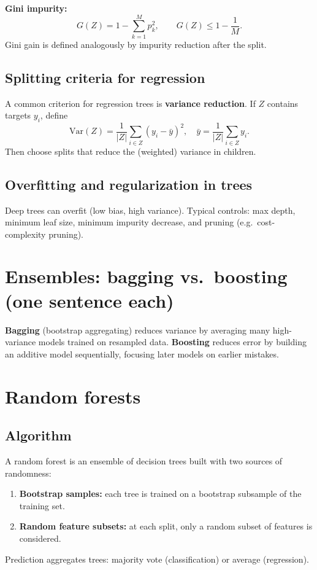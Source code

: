 \documentclass[11pt, oneside]{book}
\newcommand{\Var}{\mathrm{Var}}
\newcommand{\1}{\ind}                       %
\begin{document}
\textbf{Gini impurity:}
\[
  G(Z)=1-\sum_{k=1}^{M}p_k^2,
\qquad
G(Z)\le 1-\frac{1}{M}.
\]
Gini gain is defined analogously by impurity reduction after the split.

\subsection{Splitting criteria for regression}
A common criterion for regression trees is \textbf{variance reduction}.
If $Z$ contains targets $y_i$, define
\[
  \Var(Z)=\frac{1}{|Z|}\sum_{i\in Z}(y_i-\bar y)^2,
\quad \bar y=\frac{1}{|Z|}\sum_{i\in Z} y_i.
\]
Then choose splits that reduce the (weighted) variance in children.

\subsection{Overfitting and regularization in trees}
Deep trees can overfit (low bias, high variance). Typical controls:
max depth, minimum leaf size, minimum impurity decrease, and pruning (e.g.\ cost-complexity pruning).

\section{Ensembles: bagging vs.\ boosting (one sentence each)}
\textbf{Bagging} (bootstrap aggregating) reduces variance by averaging many high-variance models trained on resampled data.
\textbf{Boosting} reduces error by building an additive model sequentially, focusing later models on earlier mistakes.

\section{Random forests}
\subsection{Algorithm}
A random forest is an ensemble of decision trees built with two sources of randomness:
\begin{enumerate}
  \item \textbf{Bootstrap samples:} each tree is trained on a bootstrap subsample of the training set.
  \item \textbf{Random feature subsets:} at each split, only a random subset of features is considered.
\end{enumerate}
Prediction aggregates trees:
majority vote (classification) or average (regression).
\end{document}
